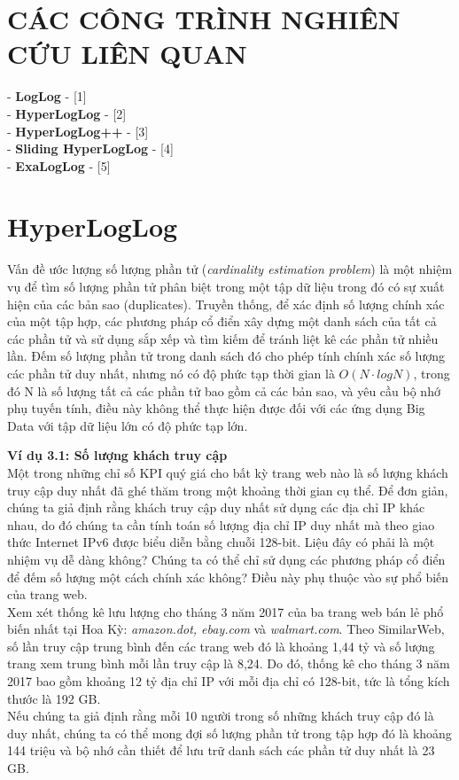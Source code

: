 \documentclass[a4paper,13pt]{article}
\theoremstyle{mytheor}
\begin{document}
\section{CÁC CÔNG TRÌNH NGHIÊN CỨU LIÊN QUAN }
- \textbf{LogLog} - [1] \\
- \textbf{HyperLogLog} - [2]\\
- \textbf{HyperLogLog++} - [3] \\
- \textbf{Sliding HyperLogLog} - [4]\\
- \textbf{ExaLogLog} - [5] \\

\section{HyperLogLog}
Vấn đề ước lượng số lượng phần tử (\textit{cardinality estimation problem}) là một nhiệm vụ để tìm số lượng phần tử phân biệt 
trong một tập dữ liệu trong đó có sự xuất hiện của các bản sao (duplicates). Truyền thống, 
để xác định số lượng chính xác của một tập hợp, các phương pháp cổ điển xây dựng 
một danh sách của tất cả các phần tử và sử dụng sắp xếp và tìm kiếm để tránh liệt kê 
các phần tử nhiều lần. Đếm số lượng phần tử trong danh sách đó cho phép tính chính xác 
số lượng các phần tử duy nhất, nhưng nó có độ phức tạp thời gian là $O(N\cdot logN)$, 
trong đó N là số lượng tất cả các phần tử bao gồm cả các bản sao, và yêu cầu 
bộ nhớ phụ tuyến tính, điều này không thể thực hiện được đối với các ứng dụng 
Big Data với tập dữ liệu lớn có độ phức tạp lớn.
\begin{mdframed}
   \textbf{Ví dụ 3.1: Số lượng khách truy cập}\\
    Một trong những chỉ số KPI quý giá cho bất kỳ trang web nào là số lượng khách truy cập duy nhất đã ghé thăm trong một khoảng thời gian cụ thể. 
    Để đơn giản, chúng ta giả định rằng khách truy cập duy nhất sử dụng các địa chỉ IP khác nhau, do đó chúng ta cần tính toán số lượng địa chỉ IP 
    duy nhất mà theo giao thức Internet IPv6 được biểu diễn bằng chuỗi 128-bit. Liệu đây có phải là một nhiệm vụ dễ dàng không? 
    Chúng ta có thể chỉ sử dụng các phương pháp cổ điển để đếm số lượng một cách chính xác không? Điều này phụ thuộc vào sự phổ biến của trang web.\\
    Xem xét thống kê lưu lượng cho tháng 3 năm 2017 của ba trang web bán lẻ phổ biến nhất tại Hoa Kỳ: \textit{amazon.dot, ebay.com} và 
    \textit{walmart.com}. Theo SimilarWeb, số lần truy cập trung bình đến các trang web đó là khoảng 1,44 tỷ và số lượng trang xem trung bình 
    mỗi lần truy cập là 8,24. Do đó, thống kê cho tháng 3 năm 2017 bao gồm khoảng 12 tỷ địa chỉ IP với mỗi địa chỉ có 128-bit, tức là tổng 
    kích thước là 192 GB.\\
    Nếu chúng ta giả định rằng mỗi 10 người trong số những khách truy cập đó là duy nhất, chúng ta có thể mong đợi số lượng phần tử 
    trong tập hợp đó là khoảng 144 triệu và bộ nhớ cần thiết để lưu trữ danh sách các phần tử duy nhất là 23 GB.
\end{mdframed}
\end{document}

